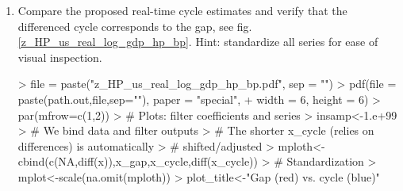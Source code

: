 \documentclass[a4paper]{book}
\begin{document}
\begin{enumerate}
\begin{itemize}
\begin{Schunk}
\begin{Sinput}
> x_gap<-x
> # Specify the real-time HP-Gap coefficients
> #   We rely on the estimates as computed by hpfilter
> #   We provide an arbitrary series of length L
> #   The real-time gap-coefficients are in the first column of fmatrix
> gamma_gap<-hpfilter(1:L,type="lambda", freq=lambda_hp)$fmatrix[,1]
> # The sum must be zero: bandpass filter applied to 
> #   original GDP in level
> sum(gamma_gap)
\end{Sinput}
\begin{Soutput}
[1] 7.264155e-17
\end{Soutput}
\begin{Sinput}
> for (j in L:length(x_gap))
+   x_gap[j] <- gamma_gap[1:L]%
> x_gap[1:(L-1)]<-NA 
\end{Sinput}
\end{Schunk}
\item HP-Cycle:
\begin{Schunk}
\begin{Sinput}
> x_cycle<-xdiff<-diff(x)
> gamma_cycle<-as.vector(imdfa_hp_cycle$b)
> # Coefficients should add to one: trend filter applied to 
> #   differenced data
> sum(gamma_cycle)
\end{Sinput}
\begin{Soutput}
[1] 1
\end{Soutput}
\begin{Sinput}
> for (j in L:length(x_cycle))
+   x_cycle[j] <- gamma_cycle%
> x_cycle[1:(L-1)]<-NA
\end{Sinput}
\end{Schunk}
\end{itemize}
\item Compare the proposed real-time cycle estimates and verify that the differenced cycle corresponds to the gap, see fig.\ref{z_HP_us_real_log_gdp_hp_bp}. Hint: standardize all series for ease of visual inspection.
\begin{Schunk}
\begin{Sinput}
> file = paste("z_HP_us_real_log_gdp_hp_bp.pdf", sep = "")
> pdf(file = paste(path.out,file,sep=""), paper = "special", 
+     width = 6, height = 6)
> par(mfrow=c(1,2))
> # Plots: filter coefficients and series
> insamp<-1.e+99
> # We bind data and filter outputs
> #   The shorter x_cycle (relies on differences) is automatically 
> #     shifted/adjusted
> mploth<-cbind(c(NA,diff(x)),x_gap,x_cycle,diff(x_cycle))
> # Standardization
> mplot<-scale(na.omit(mploth))
> plot_title<-"Gap (red) vs. cycle (blue)"

\end{Sinput}
\end{Schunk}
\end{enumerate}
\end{document}
